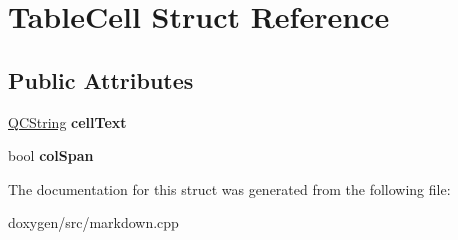 \hypertarget{struct_table_cell}{}\section{Table\+Cell Struct Reference}
\label{struct_table_cell}
\subsection*{Public Attributes}
\begin{DoxyCompactItemize}
\item 
\mbox{\label{struct_table_cell_a3e6928a9681dd87ce7ac2d64bc8abb32}} 
\mbox{\hyperlink{class_q_c_string}{Q\+C\+String}} {\bfseries cell\+Text}
\item 
\mbox{\label{struct_table_cell_ab6bd2ef4ddc612860ed7571e885ef034}} 
bool {\bfseries col\+Span}
\end{DoxyCompactItemize}


The documentation for this struct was generated from the following file\+:\begin{DoxyCompactItemize}
\item 
doxygen/src/markdown.\+cpp\end{DoxyCompactItemize}
